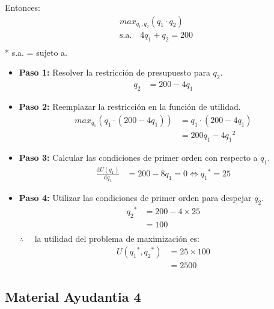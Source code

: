 \documentclass{templateNote}
\begin{document}
Entonces:
\begin{equation*}
    \begin{split}
        max_{q_1, q_2} (q_1 \cdot q_2) \\
        \text{s.a.} \quad 4q_1 + q_2 = 200 \\
    \end{split}
\end{equation*}
* s.a. = sujeto a.\\
\begin{itemize}
    \item \textbf{Paso 1:} Resolver la restricción de presupuesto para $q_2$.
    \begin{align*}
        q_2 &= 200 -4q_1
    \end{align*}
    
    \item \textbf{Paso 2:} Reemplazar la restricción en la función de utilidad.
    \begin{align*}
        max_{q_1} (q_1 \cdot (200 -4q_1)) &= q_1 \cdot (200 -4q_1) \\
        &= 200q_1 -4 {q_1}^2
    \end{align*}
    
    \item \textbf{Paso 3:} Calcular las condiciones de primer orden con respecto a $q_1$.
    \begin{align*}
        \frac{\mathrm{d} U(q_1)}{\mathrm{d}q_1} &= 200 -8q_1 = 0 \Leftrightarrow {q_1}^* = 25
    \end{align*}
    
    \item \textbf{Paso 4:} Utilizar las condiciones de primer orden para despejar $q_2$.
    \begin{align*}
        {q_2}^* &= 200 -4 \times 25 \\
        &= 100 \\
    \end{align*}
    $\therefore \quad$ la utilidad del problema de maximización es:
    \begin{align*}
        U({q_1}^*, {q_2}^*) &= 25 \times 100 \\
        &= 2500
    \end{align*}
    
\end{itemize}

\newpage
\subsection{Material Ayudantia 4}
\end{document}
